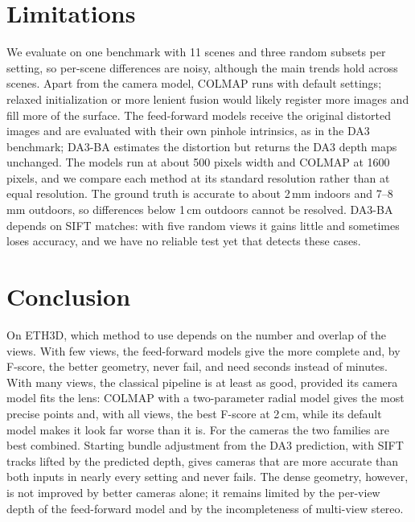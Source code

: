 \documentclass[10pt,twocolumn,letterpaper]{article}
\begin{document}
\section{Limitations}

We evaluate on one benchmark with 11 scenes and three random subsets per setting, so per-scene differences are
noisy, although the main trends hold across scenes. Apart from the camera model, COLMAP runs with default
settings; relaxed initialization or more lenient fusion would likely register more images and fill more of the
surface. The feed-forward models receive the original distorted images and are evaluated with their own pinhole
intrinsics, as in the DA3 benchmark; DA3-BA estimates the distortion but returns the DA3 depth maps unchanged. The
models run at about 500 pixels width and COLMAP at 1600 pixels, and we compare each method at its standard
resolution rather than at equal resolution. The ground truth is accurate to about 2\,mm indoors and 7--8\,mm
outdoors, so differences below 1\,cm outdoors cannot be resolved. DA3-BA depends on SIFT matches: with five
random views it gains little and sometimes loses accuracy, and we have no reliable test yet that detects these
cases.

\section{Conclusion}

On ETH3D, which method to use depends on the number and overlap of the views. With few views, the feed-forward
models give the more complete and, by F-score, the better geometry, never fail, and need seconds instead of
minutes. With many views, the classical pipeline is at least as good, provided its camera model fits the lens:
COLMAP with a two-parameter radial model gives the most precise points and, with all views, the best F-score at
2\,cm, while its default model makes it look far worse than it is. For the cameras the two families are best
combined. Starting bundle adjustment from the DA3 prediction, with SIFT tracks lifted by the predicted depth,
gives cameras that are more accurate than both inputs in nearly every setting and never fails. The dense
geometry, however, is not improved by better cameras alone; it remains limited by the per-view depth of the
feed-forward model and by the incompleteness of multi-view stereo.
\end{document}
